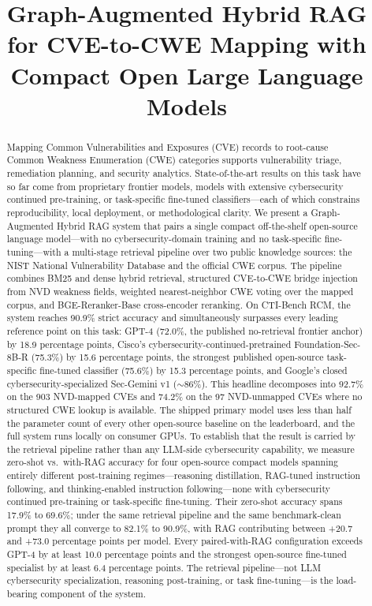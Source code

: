 \documentclass[conference,compsoc]{IEEEtran}
\begin{document}
\title{Graph-Augmented Hybrid RAG for CVE-to-CWE Mapping with Compact Open Large Language Models}

\author{}

\maketitle

\begin{abstract}
Mapping Common Vulnerabilities and Exposures (CVE) records to root-cause Common Weakness Enumeration (CWE) categories supports vulnerability triage, remediation planning, and security analytics. State-of-the-art results on this task have so far come from proprietary frontier models, models with extensive cybersecurity continued pre-training, or task-specific fine-tuned classifiers---each of which constrains reproducibility, local deployment, or methodological clarity. We present a Graph-Augmented Hybrid RAG system that pairs a single compact off-the-shelf open-source language model---with no cybersecurity-domain training and no task-specific fine-tuning---with a multi-stage retrieval pipeline over two public knowledge sources: the NIST National Vulnerability Database and the official CWE corpus. The pipeline combines BM25 and dense hybrid retrieval, structured CVE-to-CWE bridge injection from NVD weakness fields, weighted nearest-neighbor CWE voting over the mapped corpus, and BGE-Reranker-Base cross-encoder reranking. On CTI-Bench RCM, the system reaches 90.9\% strict accuracy and simultaneously surpasses every leading reference point on this task: GPT-4 (72.0\%, the published no-retrieval frontier anchor) by 18.9 percentage points, Cisco's cybersecurity-continued-pretrained Foundation-Sec-8B-R (75.3\%) by 15.6 percentage points, the strongest published open-source task-specific fine-tuned classifier (75.6\%) by 15.3 percentage points, and Google's closed cybersecurity-specialized Sec-Gemini v1 ($\sim$86\%). This headline decomposes into 92.7\% on the 903 NVD-mapped CVEs and 74.2\% on the 97 NVD-unmapped CVEs where no structured CWE lookup is available. The shipped primary model uses less than half the parameter count of every other open-source baseline on the leaderboard, and the full system runs locally on consumer GPUs. To establish that the result is carried by the retrieval pipeline rather than any LLM-side cybersecurity capability, we measure zero-shot vs.\ with-RAG accuracy for four open-source compact models spanning entirely different post-training regimes---reasoning distillation, RAG-tuned instruction following, and thinking-enabled instruction following---none with cybersecurity continued pre-training or task-specific fine-tuning. Their zero-shot accuracy spans 17.9\% to 69.6\%; under the same retrieval pipeline and the same benchmark-clean prompt they all converge to 82.1\% to 90.9\%, with RAG contributing between +20.7 and +73.0 percentage points per model. Every paired-with-RAG configuration exceeds GPT-4 by at least 10.0 percentage points and the strongest open-source fine-tuned specialist by at least 6.4 percentage points. The retrieval pipeline---not LLM cybersecurity specialization, reasoning post-training, or task fine-tuning---is the load-bearing component of the system.
\end{abstract}
\end{document}
